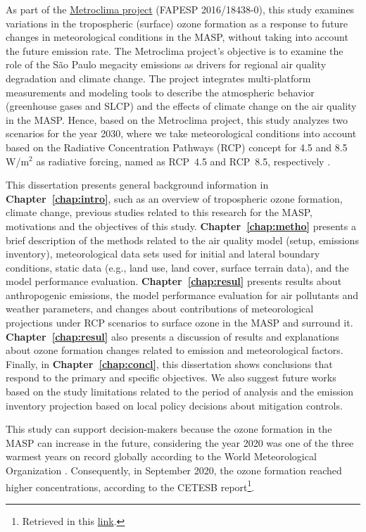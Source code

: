 As part of the \href{http://www.metroclima.iag.usp.br/}{Metroclima project} (FAPESP 2016/18438-0), this study examines variations in the tropospheric (surface) ozone formation as a response to future changes in meteorological conditions in the MASP, without taking into account the future emission rate. 
The Metroclima project's objective is to examine the role of the S\~{a}o Paulo megacity emissions as drivers for regional air quality degradation and climate change.
The project integrates multi-platform measurements and modeling tools to describe the atmospheric behavior (greenhouse gases and SLCP) and the effects of climate change on the air quality in the MASP.
Hence, based on the Metroclima project, this study analyzes two scenarios for the year 2030, where we take meteorological conditions into account based on the Radiative Concentration Pathways (RCP) concept for 4.5 and 8.5 W/m$^2$ as radiative forcing, named as RCP~4.5 and RCP~8.5, respectively \citep{VanVuuren2011a}.

This dissertation presents general background information in \textbf{Chapter~\ref{chap:intro}}, such as an overview of tropospheric ozone formation, climate change, previous studies related to this research for the MASP, motivations and the objectives of this study.
\textbf{Chapter~\ref{chap:metho}} presents a brief description of the methods related to the air quality model (setup, emissions inventory), meteorological data sets used for initial and lateral boundary conditions, static data (e.g., land use, land cover, surface terrain data), and the model performance evaluation.
\textbf{Chapter~\ref{chap:resul}} presents results about anthropogenic emissions, the model performance evaluation for air pollutants and weather parameters, and changes about contributions of meteorological projections under RCP scenarios to surface ozone in the MASP and surround it. 
\textbf{Chapter~\ref{chap:resul}} also presents a discussion of results and explanations about ozone formation changes related to emission and meteorological factors.
Finally, in \textbf{Chapter~\ref{chap:concl}}, this dissertation shows conclusions that respond to the primary and specific objectives.
We also suggest future works based on the study limitations related to the period of analysis and the emission inventory projection based on local policy decisions about mitigation controls.

This study can support decision-makers because the ozone formation in the MASP can increase in the future, considering the year 2020 was one of the three warmest years on record globally according to the World Meteorological Organization \citep{WMO2020}. Consequently, in September 2020, the ozone formation reached higher concentrations, according to the CETESB report\footnote{Retrieved in this \href{https://cetesb.sp.gov.br/ar/wp-content/uploads/sites/28/2020/11/Boletim-Mensal-da-Qualidade-do-Ar-Setembro-2020.pdf}{link}.}.


